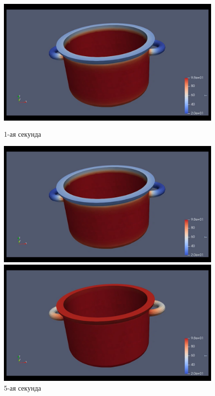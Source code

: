 \documentclass[a4paper,12pt]{article}
\theoremstyle{plain} %
\theoremstyle{definition} %
\theoremstyle{remark} %
\begin{document}
\newpage
	\begin{figure}[h]
		\begin{center}
			\begin{minipage}[h]{0.4\linewidth}
				\includegraphics[width=1\linewidth]{1s}
				\caption{1-ая секунда} %
			\end{minipage}
			\hfill
			\begin{minipage}[h]{0.4\linewidth}
				\includegraphics[width=1\linewidth]{2s}
				\caption{5-ая секунда}
			\end{minipage}
			\begin{minipage}[h]{0.4\linewidth}
				\includegraphics[width=1\linewidth]{3s}

\end{minipage}
\end{center}
\end{figure}
\end{document}
